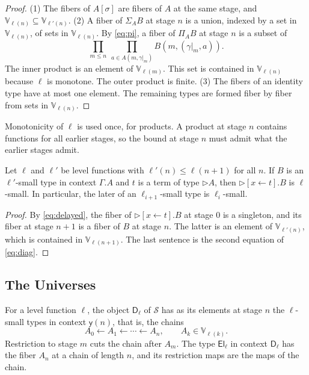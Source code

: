 \documentclass[acmsmall,nonacm,screen]{acmart}
\newcommand{\later}{{\triangleright}}
\newcommand{\El}{\mathsf{El}}
\newcommand{\Vg}{\mathbb{V}}
\newcommand{\Dg}{\mathsf{D}}
\newcommand{\Tr}{\mathcal{S}}
\newcommand{\yo}{\mathsf{y}}
\newcommand{\dsub}[2]{[#1 \leftarrow #2]}
\newcommand{\rest}[2]{#1|_{#2}}
\begin{document}
\begin{proof}
(1) The fibers of $A[\sigma]$ are fibers of $A$ at the same stage, and
$\Vg_{\ell(n)} \subseteq \Vg_{\ell'(n)}$. (2) A fiber of $\Sigma_A B$ at stage $n$ is a
union, indexed by a set in $\Vg_{\ell(n)}$, of sets in $\Vg_{\ell(n)}$. By \eqref{eq:pi}, a
fiber of $\Pi_A B$ at stage $n$ is a subset of
\[
  \prod_{m \le n}\ \prod_{a \in A(m,\rest{\gamma}{m})} B(m,(\rest{\gamma}{m},a)).
\]
The inner product is an element of $\Vg_{\ell(m)}$. This set is contained in $\Vg_{\ell(n)}$
because $\ell$ is monotone. The outer product is finite. (3) The fibers of an identity type
have at most one element. The remaining types are formed fiber by fiber from sets in
$\Vg_{\ell(n)}$.
\end{proof}

Monotonicity of $\ell$ is used once, for products. A product at stage $n$ contains functions
for all earlier stages, so the bound at stage $n$ must admit what the earlier stages
admit.

\begin{lemma}\label{lem:shift}
Let $\ell$ and $\ell'$ be level functions with $\ell'(n) \le \ell(n+1)$ for all $n$. If $B$
is an $\ell'$-small type in context $\Gamma.A$ and $t$ is a term of type $\later A$, then
$\later\dsub{x}{t}.B$ is $\ell$-small. In particular, the later of an $\ell_{i+1}$-small type
is $\ell_i$-small.
\end{lemma}

\begin{proof}
By \eqref{eq:delayed}, the fiber of $\later\dsub{x}{t}.B$ at stage $0$ is a singleton, and
its fiber at stage $n+1$ is a fiber of $B$ at stage $n$. The latter is an element of
$\Vg_{\ell'(n)}$, which is contained in $\Vg_{\ell(n+1)}$. The last sentence is the second
equation of \eqref{eq:diag}.
\end{proof}

\subsection{The Universes}

\begin{definition}
For a level function $\ell$, the object $\Dg_\ell$ of $\Tr$ has as its elements at stage $n$
the $\ell$-small types in context $\yo(n)$, that is, the chains
\[
  A_0 \longleftarrow A_1 \longleftarrow \cdots \longleftarrow A_n, \qquad A_k \in \Vg_{\ell(k)} .
\]
Restriction to stage $m$ cuts the chain after $A_m$. The type $\El_\ell$ in context
$\Dg_\ell$ has the fiber $A_n$ at a chain of length $n$, and its restriction maps are the
maps of the chain.
\end{definition}
\end{document}
